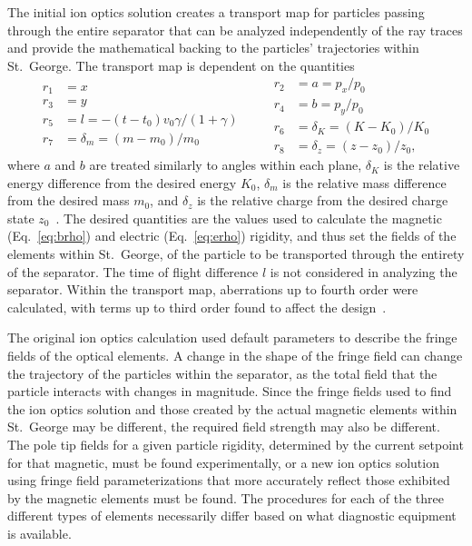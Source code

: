 The initial ion optics solution creates a transport map for particles passing
through the entire separator that can be analyzed independently of the ray
traces and provide the mathematical backing to the particles' trajectories
within St.\ George. The transport map is dependent on the quantities
\begin{equation}
    \label{eq:cosyvars}
    \begin{split}
        r_1 &= x \\
        r_3 &= y \\
        r_5 &= l = -(t - t_0)v_0\gamma/(1 + \gamma) \\
        r_7 &= \delta_m = (m - m_0)/m_0
    \end{split}
    \quad\quad
    \begin{split}
        r_2 &= a = p_x/p_0 \\
        r_4 &= b = p_y/p_0 \\
        r_6 &= \delta_K = (K - K_0)/K_0\\
        r_8 &= \delta_z = (z - z_0)/z_0,
    \end{split}
\end{equation}
where $a$ and $b$ are treated similarly to angles within each plane,
$\delta_K$ is the relative energy difference from the desired energy $K_0$,
$\delta_m$ is the relative mass difference from the desired mass $m_0$, and
$\delta_z$ is the relative charge from the desired charge state
$z_0$~\cite{COSY}.
The desired quantities are the values used to calculate the magnetic
(Eq.~\ref{eq:brho}) and electric (Eq.~\ref{eq:erho}) rigidity, and thus set the
fields of the elements within St.\ George,
of the particle to be transported through the entirety of the separator.
The time of flight difference $l$ is not considered in analyzing the separator.
Within the transport map, aberrations up to fourth order were calculated, with
terms up to third order found to affect the design~\cite{Couder2008}.

The original ion optics calculation used default parameters to describe the
fringe fields of the optical elements. A change in the shape of the fringe
field can change the trajectory of the particles within the separator, as the
total field that the particle interacts with changes in magnitude. Since the
fringe fields used to find the ion optics solution and those created by the
actual magnetic elements within St.\ George may be different, the required
field strength may also be different. The pole tip fields for a given particle
rigidity, determined by the current setpoint for that magnetic, must be found
experimentally, or a new ion optics solution using fringe field
parameterizations that more accurately reflect those exhibited by the magnetic
elements must be found. The procedures for each of the three different types
of elements necessarily differ based on what diagnostic equipment is available.

